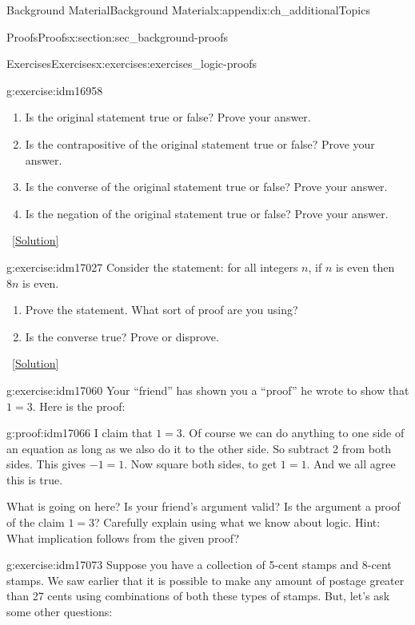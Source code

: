 \documentclass[oneside,10pt,]{book}
\numberwithin{equation}{chapter}
\begin{document}
\begin{appendixptx}{Background Material}{}{Background Material}{}{}{x:appendix:ch_additionalTopics}
\begin{sectionptx}{Proofs}{}{Proofs}{}{}{x:section:sec_background-proofs}
\begin{exercises-subsection}{Exercises}{}{Exercises}{}{}{x:exercises:exercises_logic-proofs}
\begin{divisionexercise}{1}{}{}{g:exercise:idm16958}
\begin{enumerate}[label=(\alph*)]
\item{}Is the original statement true or false? Prove your answer.%
\item{}Is the contrapositive of the original statement true or false? Prove your answer.%
\item{}Is the converse of the original statement true or false? Prove your answer.%
\item{}Is the negation of the original statement true or false? Prove your answer.%
\end{enumerate}
%
\qquad~\hfill{\tiny\hyperlink{g:solution:idm16983-main}{[Solution]}}\end{divisionexercise}%
\begin{divisionexercise}{2}{}{}{g:exercise:idm17027}%
Consider the statement: for all integers \(n\), if \(n\) is even then \(8n\) is even.%
\par
%
\begin{enumerate}[label=(\alph*)]
\item{}Prove the statement. What sort of proof are you using?%
\item{}Is the converse true? Prove or disprove.%
\end{enumerate}
%
\qquad~\hfill{\tiny\hyperlink{g:solution:idm17039-main}{[Solution]}}\end{divisionexercise}%
\begin{divisionexercise}{3}{}{}{g:exercise:idm17060}%
Your ``friend'' has shown you a ``proof'' he wrote to show that \(1 = 3\). Here is the proof:%
\begin{proofptx}{}{g:proof:idm17066}
I claim that \(1 = 3\). Of course we can do anything to one side of an equation as long as we also do it to the other side. So subtract 2 from both sides. This gives \(-1 = 1\). Now square both sides, to get \(1 = 1\). And we all agree this is true.%
\end{proofptx}
What is going on here? Is your friend's argument valid? Is the argument a proof of the claim \(1=3\)? Carefully explain using what we know about logic. Hint: What implication follows from the given proof?%
\end{divisionexercise}%
\begin{divisionexercise}{4}{}{}{g:exercise:idm17073}%
Suppose you have a collection of 5-cent stamps and 8-cent stamps. We saw earlier that it is possible to make any amount of postage greater than 27 cents using combinations of both these types of stamps. But, let's ask some other questions:%
\begin{enumerate}[label=(\alph*)]

\end{enumerate}
\end{divisionexercise}
\end{exercises-subsection}
\end{sectionptx}
\end{appendixptx}
\end{document}

